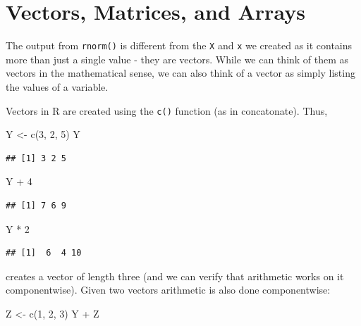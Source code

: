 \documentclass[
]{book}
\newenvironment{Shaded}{\begin{snugshade}}{\end{snugshade}}
\newcommand{\DecValTok}[1]{\textcolor[rgb]{0.00,0.00,0.81}{#1}}
\newcommand{\FunctionTok}[1]{\textcolor[rgb]{0.00,0.00,0.00}{#1}}
\newcommand{\NormalTok}[1]{#1}
\newcommand{\OtherTok}[1]{\textcolor[rgb]{0.56,0.35,0.01}{#1}}
\newcommand{\SpecialCharTok}[1]{\textcolor[rgb]{0.00,0.00,0.00}{#1}}
\begin{document}
\hypertarget{vectors-matrices-and-arrays}{%
\section{Vectors, Matrices, and Arrays}\label{vectors-matrices-and-arrays}}

The output from \texttt{rnorm()} is different from the \texttt{X} and \texttt{x} we created as it contains more than just a single value - they are vectors. While we can think of them as vectors in the mathematical sense, we can also think of a vector as simply listing the values of a variable.

Vectors in R are created using the \texttt{c()} function (as in concatonate). Thus,

\begin{Shaded}
\begin{Highlighting}[]
\NormalTok{Y }\OtherTok{\textless{}{-}} \FunctionTok{c}\NormalTok{(}\DecValTok{3}\NormalTok{, }\DecValTok{2}\NormalTok{, }\DecValTok{5}\NormalTok{)}
\NormalTok{Y}
\end{Highlighting}
\end{Shaded}

\begin{verbatim}
## [1] 3 2 5
\end{verbatim}

\begin{Shaded}
\begin{Highlighting}[]
\NormalTok{Y }\SpecialCharTok{+} \DecValTok{4}
\end{Highlighting}
\end{Shaded}

\begin{verbatim}
## [1] 7 6 9
\end{verbatim}

\begin{Shaded}
\begin{Highlighting}[]
\NormalTok{Y }\SpecialCharTok{*} \DecValTok{2}
\end{Highlighting}
\end{Shaded}

\begin{verbatim}
## [1]  6  4 10
\end{verbatim}

creates a vector of length three (and we can verify that arithmetic works on it componentwise). Given two vectors arithmetic is also done componentwise:

\begin{Shaded}
\begin{Highlighting}[]
\NormalTok{Z }\OtherTok{\textless{}{-}} \FunctionTok{c}\NormalTok{(}\DecValTok{1}\NormalTok{, }\DecValTok{2}\NormalTok{, }\DecValTok{3}\NormalTok{)}
\NormalTok{Y }\SpecialCharTok{+}\NormalTok{ Z}
\end{Highlighting}
\end{Shaded}
\end{document}
